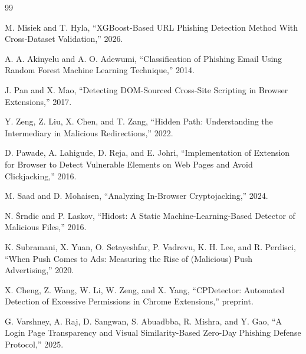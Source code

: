 \begin{thebibliography}{99}
\thispagestyle{fancy}
\fancyhf{}
\renewcommand{\headrulewidth}{0pt}

M. Misiek and T. Hyla, ``XGBoost-Based URL Phishing Detection Method With
Cross-Dataset Validation,'' 2026.

A. A. Akinyelu and A. O. Adewumi, ``Classification of Phishing Email Using
Random Forest Machine Learning Technique,'' 2014.

J. Pan and X. Mao, ``Detecting DOM-Sourced Cross-Site Scripting in Browser
Extensions,'' 2017.

Y. Zeng, Z. Liu, X. Chen, and T. Zang, ``Hidden Path: Understanding the
Intermediary in Malicious Redirections,'' 2022.

D. Pawade, A. Lahigude, D. Reja, and E. Johri, ``Implementation of Extension
for Browser to Detect Vulnerable Elements on Web Pages and Avoid Clickjacking,''
2016.

M. Saad and D. Mohaisen, ``Analyzing In-Browser Cryptojacking,'' 2024.

N. Šrndic and P. Laskov, ``Hidost: A Static Machine-Learning-Based Detector
of Malicious Files,'' 2016.

K. Subramani, X. Yuan, O. Setayeshfar, P. Vadrevu, K. H. Lee, and R. Perdisci,
``When Push Comes to Ads: Measuring the Rise of (Malicious) Push Advertising,''
2020.

X. Cheng, Z. Wang, W. Li, W. Zeng, and X. Yang, ``CPDetector: Automated
Detection of Excessive Permissions in Chrome Extensions,'' preprint.

G. Varshney, A. Raj, D. Sangwan, S. Abuadbba, R. Mishra, and Y. Gao,
``A Login Page Transparency and Visual Similarity-Based Zero-Day Phishing
Defense Protocol,'' 2025.

\end{thebibliography}
